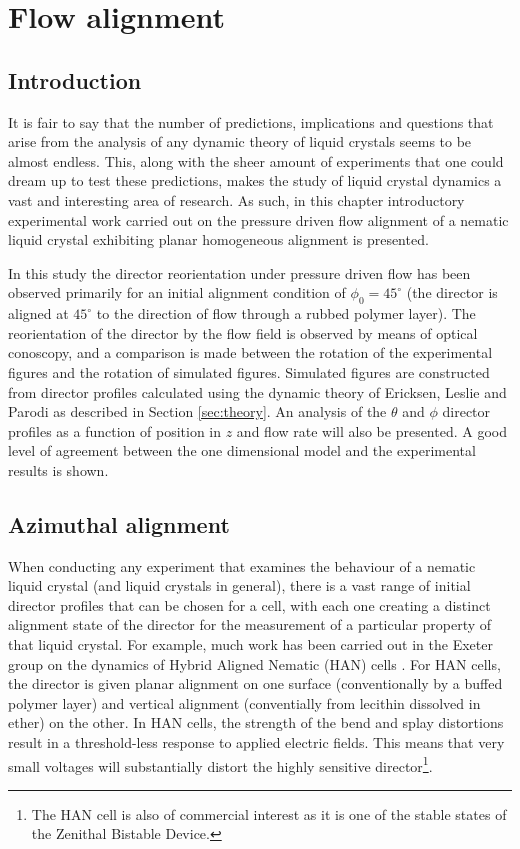 \section{Flow alignment}
\label{cha:45}
\subsection{Introduction}
It is fair to say that the number of predictions, implications and questions that arise from the analysis of any dynamic theory of liquid crystals seems to be almost endless. This, along with the sheer amount of experiments that one could dream up to test these predictions, makes the study of liquid crystal dynamics a vast and interesting area of research. As such, in this chapter introductory experimental work carried out on the pressure driven flow alignment of a nematic liquid crystal exhibiting planar homogeneous alignment is presented.

In this study the director reorientation under pressure driven flow has been observed primarily for an initial alignment condition of $\phi_0=45^{\circ}$ (the director is aligned at $45^{\circ}$ to the direction of flow through a rubbed polymer layer). The reorientation of the director by the flow field is observed by means of optical conoscopy, and a comparison is made between the rotation of the experimental figures and the rotation of simulated figures. Simulated figures are constructed from director profiles calculated using the dynamic theory of Ericksen, Leslie and Parodi as described in Section \ref{sec:theory}. An analysis of the $\theta$ and $\phi$ director profiles as a function of position in $z$ and flow rate will also be presented. A good level of agreement between the one dimensional model and the experimental results is shown.

\subsection{Azimuthal alignment}
When conducting any experiment that examines the behaviour of a nematic liquid crystal (and liquid crystals in general), there is a vast range of initial director profiles that can be chosen for a cell, with each one creating a distinct alignment state of the director for the measurement of a particular property of that liquid crystal. For example, much work has been carried out in the Exeter group on the dynamics of Hybrid Aligned Nematic (HAN) cells \cite{Jewell2003,Jewell2004,Jewell2005,Yang2007,Jewell2002a}. For HAN cells, the director is given planar alignment on one surface (conventionally by a buffed polymer layer) and vertical alignment (conventially from lecithin dissolved in ether) on the other. In HAN cells, the strength of the bend and splay distortions result in a threshold-less response to applied electric fields. This means that very small voltages will substantially distort the highly sensitive director\footnote{The HAN cell is also of commercial interest as it is one of the stable states of the Zenithal Bistable Device.}.

